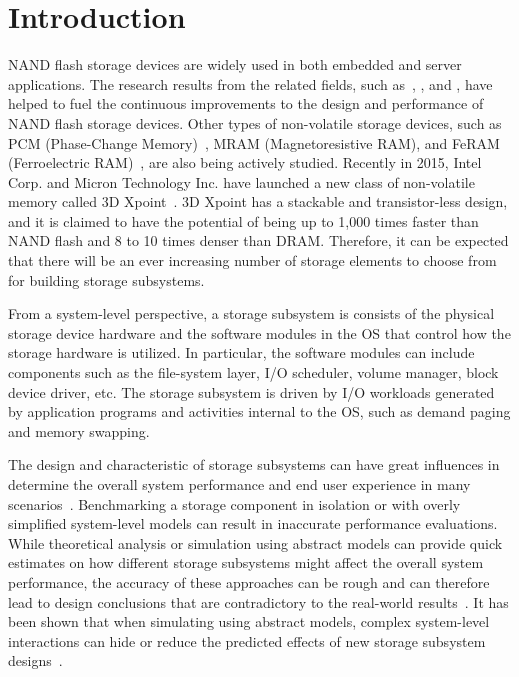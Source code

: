 \chapter{Introduction}

NAND flash storage devices are widely used in both embedded and server applications. The research results from the related fields, such as~\cite{Chang:2010}, \cite{Wu:2010}, and \cite{Chang:2012}, have helped to fuel the continuous improvements to the design and performance of NAND flash storage devices. Other types of non-volatile storage devices, such as PCM (Phase-Change Memory)~\cite{Zilberberg:2013}, MRAM (Magnetoresistive RAM), and FeRAM (Ferroelectric RAM)~\cite{Doh:2007}, are also being actively studied. Recently in 2015, Intel Corp. and Micron Technology Inc. have launched a new class of non-volatile memory called 3D Xpoint~\cite{wiki:3DXpoint}. 3D Xpoint has a stackable and transistor-less design, and it is claimed to have the potential of being up to 1,000 times faster than NAND flash and 8 to 10 times denser than DRAM. Therefore, it can be expected that there will be an ever increasing number of storage elements to choose from for building storage subsystems.

From a system-level perspective, a storage subsystem is consists of the physical storage device hardware and the software modules in the OS that control how the storage hardware is utilized. In particular, the software modules can include components such as the file-system layer, I/O scheduler, volume manager, block device driver, etc. The storage subsystem is driven by I/O workloads generated by application programs and activities internal to the OS, such as demand paging and memory swapping.

The design and characteristic of storage subsystems can have great influences in determine the overall system performance and end user experience in many scenarios~\cite{Kim:2012}. Benchmarking a storage component in isolation or with overly simplified system-level models can result in inaccurate performance evaluations. While theoretical analysis or simulation using abstract models can provide quick estimates on how different storage subsystems might affect the overall system performance, the accuracy of these approaches can be rough and can therefore lead to design conclusions that are contradictory to the real-world results~\cite{Thekkath:1994}. It has been shown that when simulating using abstract models, complex system-level interactions can hide or reduce the predicted effects of new storage subsystem designs~\cite{Ganger:1998}.

